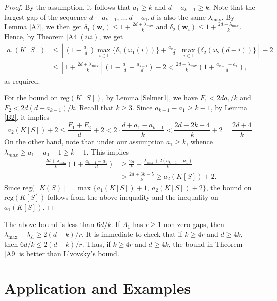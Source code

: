 \documentclass[11pt]{article}
\def\reg{\mathrm{reg}}
\def\wbf{{\mathbf w}}
\def\Iset{{\mathbb I}}
\theoremstyle{remark}
\theoremstyle{definition}
\begin{document}
\begin{proof} By the assumption, it follows that $a_1 \geq k$ and $d- a_{k-1} \geq k$. Note that the largest gap of the sequence $d- a_{k-1},\ldots, d - a_1, d$ is also the same $\lambda_{\max}$. By Lemma \ref{A7}, we then get $\delta_1(\wbf_i) \leq 1+  \frac{2d + \lambda_{\max}}{k}$ and $\delta_2(\wbf_i) \leq 1+ \frac{2d + \lambda_{\max}}{k}$. Hence, by Theorem \ref{A4}\((iii)\), we get
\begin{align*}
    a_1(K[S]) & \leq \left\lfloor \left( 1- \frac{a_1}{d} \right)  \max_{i\in \Iset} \{\delta_1(\omega_1(i)) \} +  \frac{a_{k-1}}{d}  \max_{i\in \Iset}
\{  \delta_2(\omega_2(d-i)) \} \right\rfloor  - 2\\
& \leq \left\lfloor 1 +   \frac{2d + \lambda_{\max}}{k} \right\rfloor \left( 1 - \frac{a_1}{d} + \frac{a_{k-1}}{d} \right) - 2 <  \frac{2d+\lambda_{\max}}{k}\left( 1+\frac{a_{k-1}-a_1}{d} \right),
\end{align*}
as required.

For the bound on $\reg(K[S])$, by Lemma \ref{Selmer1}, we have $F_1 < 2da_1/k$ and $F_2 < 2d(d-a_{k-1})/k$. Recall that $k\ge 3$. Since $a_{k-1} - a_1 \geq k-1$, by Lemma \ref{B2}, it implies
$$a_2(K[S]) +2 \leq \frac{F_1+F_2}{d}  +2 < 2\cdot\frac{d + a_1 - a_{k-1}}{k} < \frac{2d - 2k+4}{k} + 2  = \frac{2d+4}{k} .$$
On the other hand, note that  under our assumption $a_1\geq k$, whence $\lambda_{max} \geq a_1-a_0-1 \geq k-1$. This implies 
\begin{align*}
    \frac{2d+\lambda_{\max}}{k} \left( 1+\frac{a_{k-1}-a_1}{d} \right) &\geq \frac{2d}{k} + \frac{\lambda_{\max }+ 2(a_{k-1}- a_1)}{k} \\
&> \frac{2d + 3k-5}{k}  \geq a_2(K[S]) +2.
\end{align*}
Since $\reg([K(S)] = \max\{a_1(K[S]) + 1,\ a_2(K[S]) + 2\}$,  the bound on $\reg(K[S])$ follows from the above inequality and the inequality on $a_1(K[S])$.
\end{proof}
The above bound is less than $6d/k$. If $A_1$ has $r\geq 1$ non-zero gaps, then $\lambda_{\max} + \lambda_{\mathrm{sl}} \geq 2(d-k)/r$. It is immediate to check that if $k\geq 4r$ and $d\geq 4k$, then $6d/k \leq 2(d-k)/r$. Thus, if $k\geq 4r$ and $d\geq 4k$, the bound in Theorem \ref{A9} is better than L'vovsky's bound.

\section{Application and Examples} \label{Appl}
\end{document}
